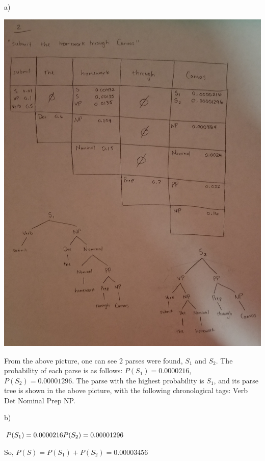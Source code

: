 \begin{solution}
a)

\includegraphics[scale=0.15]{q2-a}

From the above picture, one can see 2 parses were found, $S_1$ and $S_2$. The probability of each parse is as follows: $P(S_1) = 0.0000216$, $P(S_2) = 0.00001296$. The parse with the highest probability is $S_1$, and its parse tree is shown in the above picture, with the following chronological tags: Verb Det Nominal Prep NP.

b)

$P(S_1) = 0.0000216\\
P(S_2) = 0.00001296$

So, $P(S) = P(S_1) + P(S_2) = \mathbf{0.00003456}$
\end{solution}